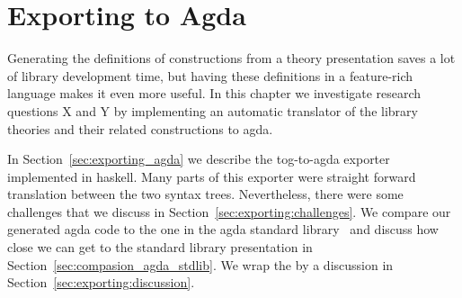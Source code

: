 \chapter{Exporting to Agda}
\label{ch:export}


Generating the definitions of constructions from a theory presentation saves a lot of library development time, but having these definitions in a feature-rich language makes it even more useful. In this chapter we investigate research questions X and Y by implementing an automatic translator of the library theories and their related constructions to agda.

In Section~\ref{sec:exporting_agda} we describe the tog-to-agda exporter implemented in haskell. Many parts of this exporter were straight forward translation between the two syntax trees. Nevertheless, there were some challenges that we discuss in Section~\ref{sec:exporting:challenges}. We compare our generated agda code to the one in the agda standard library~\cite{agda_stdlib} and discuss how close we can get to the standard library presentation in Section~\ref{sec:compasion_agda_stdlib}. 
We wrap the by a discussion in Section~\ref{sec:exporting:discussion}. 

\begin{comment}
One of the problems we highlight here is how design decisions lead to different presentations of the same theory, forcing developers to rewrite the same mathematical knowledge in different ways. In this chapter, we investigate the following question
\begin{itemize}
\item Given the tog abstract representation, can we export to formal systems with more complex meta theory and design decision. 
\end{itemize}
\end{comment}

